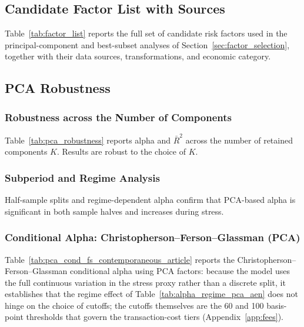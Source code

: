 

\subsection{Candidate Factor List with Sources}
\label{app:factor_list}
Table~\ref{tab:factor_list} reports the full set of candidate risk
factors used in the principal-component and best-subset analyses of
Section~\ref{sec:factor_selection}, together with
their data sources, transformations, and economic category.



\subsection{PCA Robustness}
\label{app:pca_robustness}

\subsubsection{Robustness across the Number of Components}
\label{app:pca_wk}

Table~\ref{tab:pca_robustness} reports alpha and $\bar{R}^2$ across the
number of retained components $K$. Results are robust to the choice of $K$.



\subsubsection{Subperiod and Regime Analysis}
\label{app:pca_subperiod}

Half-sample splits and regime-dependent alpha confirm that PCA-based
alpha is significant in both sample halves and increases during
stress.



\subsubsection{Conditional Alpha: Christopherson--Ferson--Glassman (PCA)}
\label{app:pca_conditional}

Table~\ref{tab:pca_cond_fs_contemporaneous_article} reports the
Christopherson--Ferson--Glassman conditional alpha using PCA factors:
because the model uses the full continuous variation in the stress
proxy rather than a discrete split, it establishes that the regime
effect of Table~\ref{tab:alpha_regime_pca_aen} does not hinge on the
choice of cutoffs; the cutoffs themselves are the 60 and 100
basis-point thresholds that govern the transaction-cost tiers
(Appendix~\ref{app:fees}).

